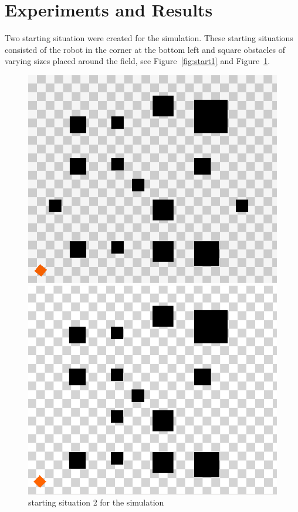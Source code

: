 \documentclass[conference]{IEEEtran}
\begin{document}
\section{Experiments and Results}
Two starting situation were created for the simulation. These starting situations consisted of the robot in the corner at the bottom left and square obstacles of varying sizes placed around the field, see Figure~\ref{fig:start1} and Figure~\ref{fig:start2}.

\begin{figure}[!ht]
  \centering
  \includegraphics[scale=0.3]{./figs/StartSetup.png}
  \caption{starting situation 1 for the simulation}
  \label{fig:start1}
  \includegraphics[scale=0.3]{./figs/StartSetup2.png}
  \caption{starting situation 2 for the simulation}
  \label{fig:start2}
\end{figure}
\end{document}
